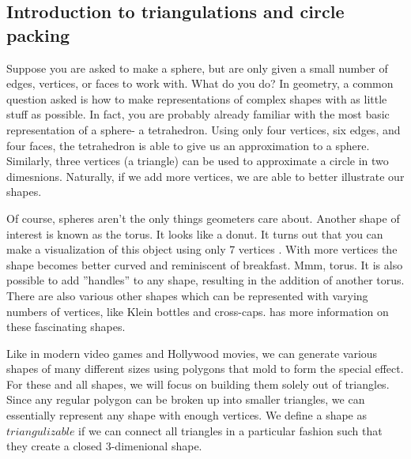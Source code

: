 \documentclass[12pt]{article}
\begin{document}
  \subsection{Introduction to triangulations and circle packing}
  \maketitle
  Suppose you are asked to make a sphere, but are only given a small number of edges, vertices, or faces to work with. What do you do? In geometry, a common question asked is how to make representations of complex shapes with as little stuff as possible. In fact, you are probably already familiar with the most basic representation of a sphere- a tetrahedron. Using only four vertices, six edges, and four faces, the tetrahedron is able to give us an approximation to a sphere. Similarly, three vertices (a triangle) can be used to approximate a circle in two dimesnions. Naturally, if we add more vertices, we are able to better illustrate our shapes. \newline
  
   \noindent Of course, spheres aren't the only things geometers care about. Another shape of interest is known as the torus. It looks like a donut. It turns out that you can make a visualization of this object using only 7 vertices \cite{lutzmanifold}. With more vertices the shape becomes better curved and reminiscent of breakfast. Mmm, torus. It is also possible to add ''handles'' to any shape, resulting in the addition of another torus. There are also various other shapes which can be represented with varying numbers of vertices, like Klein bottles and cross-caps.\cite{WolfMath} has more information on these fascinating shapes.\newline
   
   \noindent Like in modern video games and Hollywood movies, we can generate various shapes of many different sizes using polygons that mold to form the special effect. For these and all shapes, we will focus on building them solely out of triangles. Since any regular polygon can be broken up into smaller triangles, we can essentially represent any shape with enough vertices. We define a shape as $triangulizable$ if we can connect all triangles in a particular fashion such that they create a closed 3-dimenional shape.\newline
  
\end{document}
